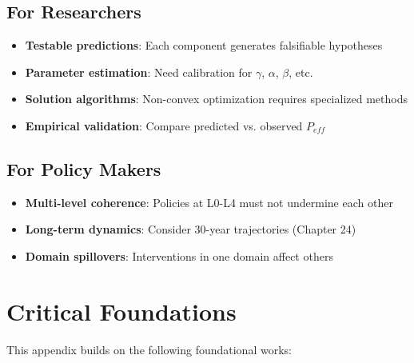 \subsection{For Researchers}

\begin{itemize}
\item \textbf{Testable predictions}: Each component generates falsifiable hypotheses
\item \textbf{Parameter estimation}: Need calibration for $\gamma$, $\alpha$, $\beta$, etc.
\item \textbf{Solution algorithms}: Non-convex optimization requires specialized methods
\item \textbf{Empirical validation}: Compare predicted vs. observed $P_{eff}$
\end{itemize}

\subsection{For Policy Makers}

\begin{itemize}
\item \textbf{Multi-level coherence}: Policies at L0-L4 must not undermine each other
\item \textbf{Long-term dynamics}: Consider 30-year trajectories (Chapter 24)
\item \textbf{Domain spillovers}: Interventions in one domain affect others
\end{itemize}

\section{Critical Foundations}
\label{sec:mp-foundations}

This appendix builds on the following foundational works:

